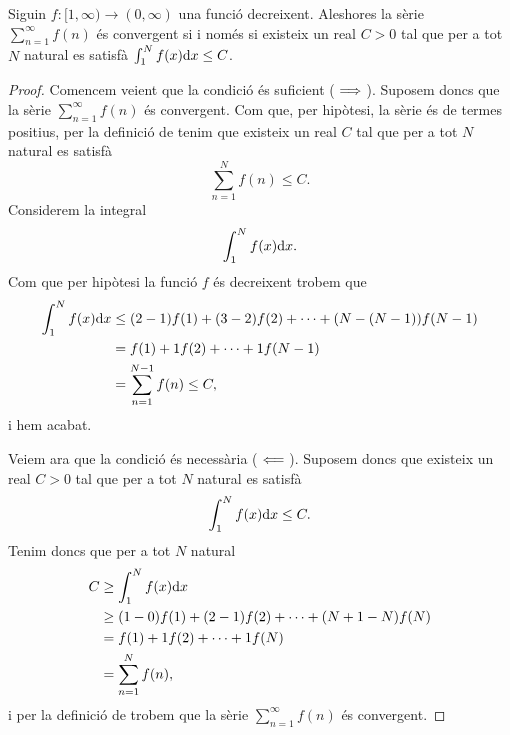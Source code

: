\documentclass[../Apunts.tex]{subfiles}
\begin{document}
	\begin{proposition}
		\label{prop:criteri de la integral}
		Siguin \(f\colon[1,\infty)\longrightarrow(0,\infty)\) una funció decreixent. Aleshores la sèrie \(\sum_{n=1}^{\infty}f(n)\) és convergent si i només si existeix un real \(C>0\) tal que per a tot \(N\) natural es satisfà \(\int_{1}^{N}f(x)\textrm{d} x\leq C\).
		\begin{proof}
			Comencem veient que la condició és suficient (\(\implies\)). Suposem doncs que la sèrie \(\sum_{n=1}^{\infty}f(n)\) és convergent. Com que, per hipòtesi, la sèrie és de termes positius, per la definició de  tenim que existeix un real \(C\) tal que per a tot \(N\) natural es satisfà
			\[\sum_{n=1}^{N}f(n)\leq C.\]
			Considerem la integral
			\[\int_{1}^{N}f(x)\textrm{d} x.\]
			Com que per hipòtesi la funció \(f\) és decreixent trobem que
			\begin{align*}
				\int_{1}^{N}f(x)\textrm{d} x&\leq(2-1)f(1)+(3-2)f(2)+\dots+(N-(N-1))f(N-1)\\
				&=f(1)+1f(2)+\dots+1f(N-1)\\
				&=\sum_{n=1}^{N-1}f(n)\leq C,
			\end{align*}
			i hem acabat.
			
			Veiem ara que la condició és necessària (\(\impliedby\)). Suposem doncs que existeix un real \(C>0\) tal que per a tot \(N\) natural es satisfà
			\[\int_{1}^{N}f(x)\textrm{d} x\leq C.\]
			Tenim doncs que per a tot \(N\) natural
			\begin{align*}
				C&\geq\int_{1}^{N}f(x)\textrm{d} x \\
				&\geq(1-0)f(1)+(2-1)f(2)+\dots+(N+1-N)f(N) \\
				&=f(1)+1f(2)+\dots+1f(N) \\
				&=\sum_{n=1}^{N}f(n),
			\end{align*}
			i per la definició de  trobem que la sèrie \(\sum_{n=1}^{\infty}f(n)\) és convergent.
		\end{proof}
	\end{proposition}
\end{document}
